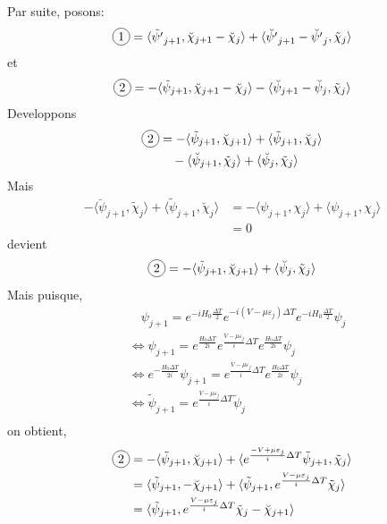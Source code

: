 Par suite, posons:
\begin{equation}
\circled{1}=\langle \tilde{\psi'}_{j+1}, \breve{\chi}_{j+1} - \breve{\chi}_{j} \rangle + \langle \breve{\psi'}_{j+1} - \breve{\psi'}_{j}, \tilde{\chi}_{j} \rangle
\end{equation}
et
\begin{equation}
\circled{2}=-\langle \tilde{\psi}_{j+1},\breve{\chi}_{j+1} - \breve{\chi}_{j} \rangle -\langle \breve{\psi}_{j+1} - \breve{\psi}_{j}, \tilde{\chi}_{j} \rangle
\end{equation}
Developpons 
\begin{align*}
\circled{2} 
&=-\langle \tilde{\psi}_{j+1},\breve{\chi}_{j+1} \rangle + \langle \tilde{\psi}_{j+1}, \breve{\chi}_{j} \rangle\\
&\quad -\langle \breve{\psi}_{j+1}, \tilde{\chi}_{j} \rangle + \langle \breve{\psi}_{j}, \tilde{\chi}_{j} \rangle
\end{align*}
Mais
\begin{align*}
-\langle \breve{\psi}_{j+1}, \tilde{\chi}_{j} \rangle + \langle \tilde{\psi}_{j+1}, \breve{\chi}_{j} \rangle
&= -\langle \psi_{j+1}, \chi_{j} \rangle + \langle \psi_{j+1}, \chi_{j} \rangle\\
&=0
\end{align*}
 devient
$$
\circled{2} =-\langle \tilde{\psi}_{j+1},\breve{\chi}_{j+1} \rangle + \langle \breve{\psi}_{j}, \tilde{\chi}_{j} \rangle
$$
Mais puisque,
\begin{align}
\nonumber
&\quad\psi_{j+1} = e^{-iH_0\frac{\Delta T}{2}} e^{-i(V-\mu\varepsilon_j)\Delta T} e^{-iH_0\frac{\Delta T}{2}} \psi_j\\
&\Leftrightarrow \psi_{j+1} = e^{\frac{H_0\Delta T}{2i}} e^{\frac{V-\mu\varepsilon_j}{i}\Delta T} e^{\frac{H_0\Delta T}{2i}} \psi_j\\
\nonumber
&\Leftrightarrow e^{-\frac{H_0\Delta T}{2i}}\psi_{j+1} =  e^{\frac{V-\mu\varepsilon_j}{i}\Delta T} e^{\frac{H_0\Delta T}{2i}} \psi_j\\
&\Leftrightarrow \tilde{\psi}_{j+1} =  e^{\frac{V-\mu\varepsilon_j}{i}\Delta T}  \breve{\psi}_j\\
\nonumber
\end{align}
on obtient,
\begin{align*}
\circled{2} 
&=-\langle \tilde{\psi}_{j+1},\breve{\chi}_{j+1} \rangle + \langle e^{\frac{-V+\mu\varepsilon_j}{i}\Delta T}\tilde{\psi}_{j+1}, \tilde{\chi}_{j} \rangle\\
&=\langle \tilde{\psi}_{j+1},-\breve{\chi}_{j+1} \rangle + \langle \tilde{\psi}_{j+1}, e^{\frac{V-\mu\varepsilon_j}{i}\Delta T}\tilde{\chi}_{j} \rangle\\
&= \langle \tilde{\psi}_{j+1}, e^{\frac{V-\mu\varepsilon_j}{i}\Delta T}\tilde{\chi}_{j} - \breve{\chi}_{j+1} \rangle
\end{align*}
